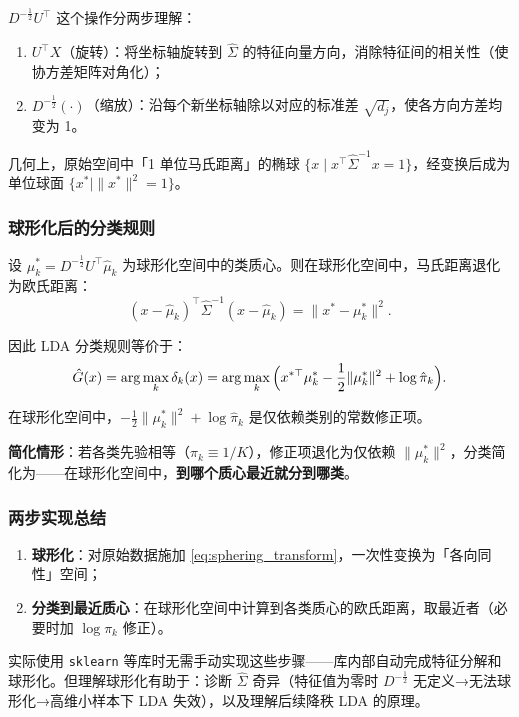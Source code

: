 $D^{-\frac12} U^\top$ 这个操作分两步理解：

\begin{enumerate}[label=(\arabic*)]
    \item $U^\top X$（旋转）：将坐标轴旋转到 $\hat{\Sigma}$ 的特征向量方向，消除特征间的相关性（使协方差矩阵对角化）；
    \item $D^{-\frac12}(\cdot)$（缩放）：沿每个新坐标轴除以对应的标准差 $\sqrt{d_j}$，使各方向方差均变为 1。
\end{enumerate}

几何上，原始空间中「1 单位马氏距离」的椭球 $\{x \mid x^\top\hat{\Sigma}^{-1}x = 1\}$，经变换后成为单位球面 $\{x^* \mid \|x^*\|^2 = 1\}$。

\subsubsection{球形化后的分类规则}

设 $\mu_k^* = D^{-\frac12} U^\top \hat{\mu}_k$ 为球形化空间中的类质心。则在球形化空间中，马氏距离退化为欧氏距离：
\[
(x - \hat{\mu}_k)^\top \hat{\Sigma}^{-1} (x - \hat{\mu}_k)
= \|x^* - \mu_k^*\|^2.
\]

因此 LDA 分类规则等价于：
\[
\hat{G}(x) = \arg\max_k \delta_k(x)
= \arg\max_k \Big( x^{*\top}\mu_k^* - \frac12 \|\mu_k^*\|^2 + \log\hat{\pi}_k \Big).
\]

在球形化空间中，$- \frac12 \|\mu_k^*\|^2 + \log\hat{\pi}_k$ 是仅依赖类别的常数修正项。

\textbf{简化情形}：若各类先验相等（$\pi_k \equiv 1/K$），修正项退化为仅依赖 $\|\mu_k^*\|^2$，分类简化为——在球形化空间中，\textbf{到哪个质心最近就分到哪类}。

\subsubsection{两步实现总结}

\begin{enumerate}[label=(\arabic*)]
    \item \textbf{球形化}：对原始数据施加 \eqref{eq:sphering_transform}，一次性变换为「各向同性」空间；
    \item \textbf{分类到最近质心}：在球形化空间中计算到各类质心的欧氏距离，取最近者（必要时加 $\log\pi_k$ 修正）。
\end{enumerate}

\begin{remark}
实际使用 \texttt{sklearn} 等库时无需手动实现这些步骤——库内部自动完成特征分解和球形化。但理解球形化有助于：诊断 $\hat{\Sigma}$ 奇异（特征值为零时 $D^{-\frac12}$ 无定义→无法球形化→高维小样本下 LDA 失效），以及理解后续降秩 LDA 的原理。
\end{remark}



